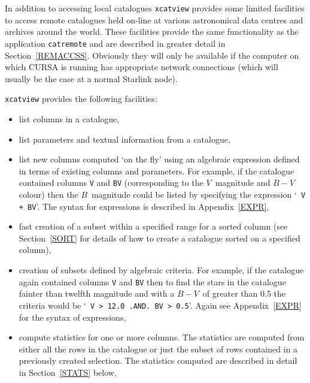 \documentclass[twoside,11pt]{article}
\renewcommand{\_}{\texttt{\symbol{95}}}
\begin{document}
In addition to accessing local catalogues {\tt xcatview} provides some
limited facilities to access remote catalogues held on-line at various
astronomical data centres and archives around the world.  These facilities
provide the same functionality as the application {\tt catremote} and
are described in greater detail in Section~\ref{REMACCSS}.  Obviously
they will only be available if the computer on which CURSA is running
has appropriate network connections (which will usually be the case at
a normal Starlink node).

{\tt xcatview} provides the following facilities:

\begin{itemize}

  \item list columns in a catalogue,

  \item list parameters and textual information from a catalogue,

  \item list new columns computed `on the fly' using an algebraic
   expression defined in terms of existing columns and parameters. For
   example, if the catalogue contained columns {\tt V} and {\tt B\_V}
   (corresponding to the $V$\, magnitude and $B-V$\, colour) then the
   $B$\, magnitude  could be listed by specifying the expression `{\tt
   V + B\_V}'. The syntax for expressions is described in
   Appendix~\ref{EXPR},

  \item fast creation of a subset within a specified range for a sorted
   column (see Section~\ref{SORT} for details of how to create a
   catalogue sorted on a specified column),

  \item creation of subsets defined by algebraic criteria. For example,
   if the catalogue again contained columns {\tt V} and {\tt B\_V} then
   to find the stars in the catalogue fainter than twelfth magnitude
   and with a $B-V$\, of greater than 0.5 the criteria would be `{\tt
   V > 12.0 .AND. B\_V > 0.5}'. Again see Appendix~\ref{EXPR} for the
   syntax of expressions,

  \item compute statistics for one or more columns.  The statistics
   are computed from either all the rows in the catalogue or just the
   subset of rows contained in a previously created selection.  The
   statistics computed are described in detail in Section~\ref{STATS}
   below,


\end{itemize}
\end{document}

